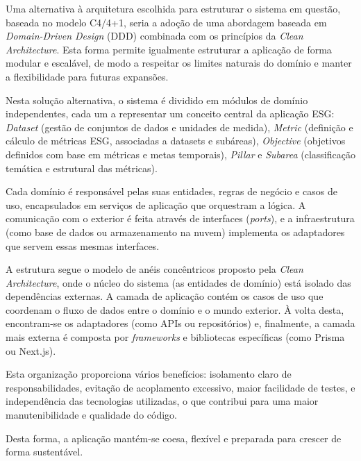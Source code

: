Uma alternativa à arquitetura escolhida para estruturar o sistema em questão, baseada no modelo C4/4+1, seria a adoção de uma abordagem baseada em \textit{Domain-Driven Design} (DDD) combinada com os princípios da \textit{Clean Architecture}. Esta forma permite igualmente estruturar a aplicação de forma modular e escalável, de modo a respeitar os limites naturais do domínio e manter a flexibilidade para futuras expansões.

Nesta solução alternativa, o sistema é dividido em módulos de domínio independentes, cada um a representar um conceito central da aplicação ESG: \textit{Dataset} (gestão de conjuntos de dados e unidades de medida), \textit{Metric} (definição e cálculo de métricas ESG, associadas a datasets e subáreas), \textit{Objective} (objetivos definidos com base em métricas e metas temporais), \textit{Pillar} e \textit{Subarea} (classificação temática e estrutural das métricas).

Cada domínio é responsável pelas suas entidades, regras de negócio e casos de uso, encapsulados em serviços de aplicação que orquestram a lógica. A comunicação com o exterior é feita através de interfaces (\textit{ports}), e a infraestrutura (como base de dados ou armazenamento na nuvem) implementa os adaptadores que servem essas mesmas interfaces.

A estrutura segue o modelo de anéis concêntricos proposto pela \textit{Clean Architecture}, onde o núcleo do sistema (as entidades de domínio) está isolado das dependências externas. A camada de aplicação contém os casos de uso que coordenam o fluxo de dados entre o domínio e o mundo exterior. À volta desta, encontram-se os adaptadores (como APIs ou repositórios) e, finalmente, a camada mais externa é composta por \textit{frameworks} e bibliotecas específicas (como Prisma ou Next.js).

Esta organização proporciona vários benefícios: isolamento claro de responsabilidades, evitação de acoplamento excessivo, maior facilidade de testes, e independência das tecnologias utilizadas, o que contribui para uma maior manutenibilidade e qualidade do código.

Desta forma, a aplicação mantém-se coesa, flexível e preparada para crescer de forma sustentável.